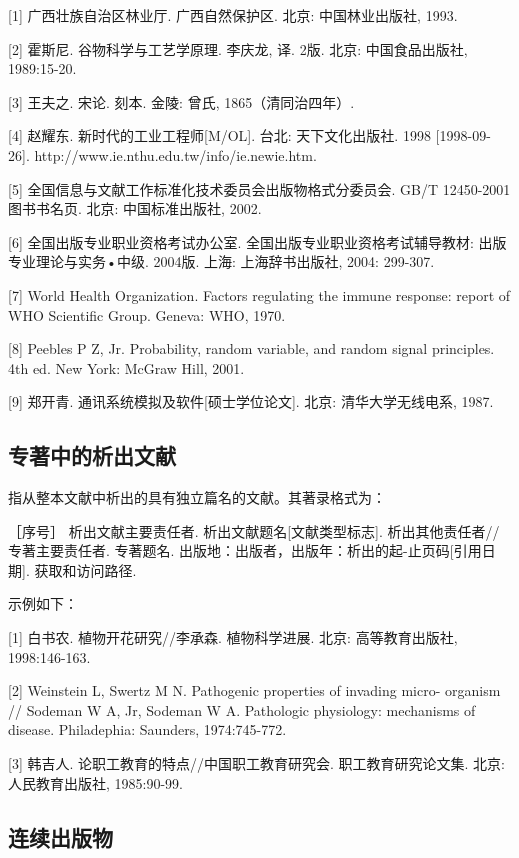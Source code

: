 [1] 广西壮族自治区林业厅. 广西自然保护区. 北京: 中国林业出版社, 1993.

[2] 霍斯尼. 谷物科学与工艺学原理. 李庆龙, 译. 2版. 北京: 中国食品出版社, 1989:15-20.

[3] 王夫之. 宋论. 刻本. 金陵: 曾氏, 1865（清同治四年）.

[4] 赵耀东. 新时代的工业工程师[M/OL]. 台北: 天下文化出版社. 1998 [1998-09-26]. http://www.ie.nthu.edu.tw/info/ie.newie.htm.

[5] 全国信息与文献工作标准化技术委员会出版物格式分委员会. GB/T 12450-2001 图书书名页. 北京: 中国标准出版社, 2002.

[6] 全国出版专业职业资格考试办公室. 全国出版专业职业资格考试辅导教材: 出版专业理论与实务•中级. 2004版. 上海: 上海辞书出版社, 2004: 299-307.

[7] World Health Organization. Factors regulating the immune response: report of WHO Scientific Group. Geneva: WHO, 1970.

[8] Peebles P Z, Jr. Probability, random variable, and random signal principles. 4th ed. New York: McGraw Hill, 2001.

[9] 郑开青. 通讯系统模拟及软件[硕士学位论文]. 北京: 清华大学无线电系, 1987.

\subsection{专著中的析出文献}

指从整本文献中析出的具有独立篇名的文献。其著录格式为：

\kaishu
［序号］ 析出文献主要责任者. 析出文献题名[文献类型标志]. 析出其他责任者//专著主要责任者. 专著题名. 出版地：出版者，出版年：析出的起-止页码[引用日期]. 获取和访问路径.

\songti
示例如下：

[1] 白书农. 植物开花研究//李承森. 植物科学进展. 北京: 高等教育出版社, 1998:146-163.

[2] Weinstein L, Swertz M N. Pathogenic properties of invading micro- organism // Sodeman W A, Jr, Sodeman W A. Pathologic physiology: mechanisms of disease. Philadephia: Saunders, 1974:745-772.

[3] 韩吉人. 论职工教育的特点//中国职工教育研究会. 职工教育研究论文集. 北京: 人民教育出版社, 1985:90-99.

\subsection{连续出版物}

